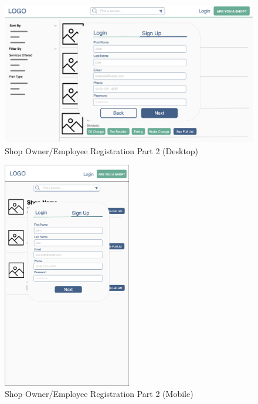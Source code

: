 \documentclass[12pt, titlepage]{article}
\begin{document}
\begin{figure}[H]
	\centering
	\includegraphics[width=\textwidth]{mockups/Shop Sign Up (Part 1) (Desktop).png}
	\caption{Shop Owner/Employee Registration \textemdash{} Part 2 (Desktop)}
\end{figure}

\begin{figure}[H]
	\centering
	\includegraphics[width=0.5\textwidth]{mockups/Shop Sign Up (Part 1) (Mobile).png}
	\caption{Shop Owner/Employee Registration \textemdash{} Part 2 (Mobile)}
\end{figure}
\end{document}
